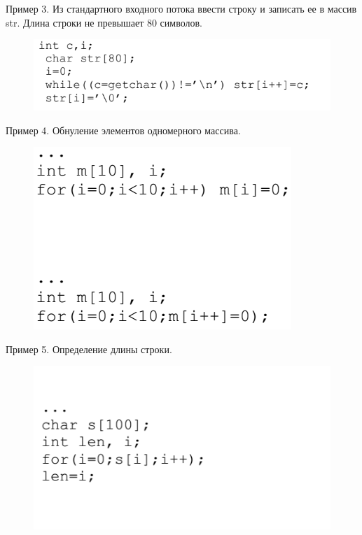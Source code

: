 \documentclass{beamer}
\begin{document}
\begin{frame}
Пример 3. Из стандартного входного потока ввести строку и записать ее в массив str. Длина строки не превышает 80 символов. 
\begin{figure}[h]
\centering
\includegraphics[scale=0.5]{images/lec02-pic07.png}
\end{figure}
\end{frame}

\begin{frame}
Пример 4. Обнуление элементов одномерного массива. 
\begin{figure}[h]
\centering
\includegraphics[scale=0.5]{images/lec02-pic08.png}
\end{figure}
\end{frame}

\begin{frame}
Пример 5. Определение длины строки. 
\begin{figure}[h]
\centering
\includegraphics[scale=0.5]{images/lec02-pic09.png}
\end{figure}
\end{frame}
\end{document}
